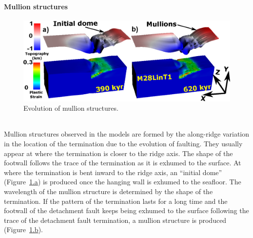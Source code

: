 \paragraph{Mullion structures}

\begin{figure}[h]
  \centering
    \includegraphics[width=1.0\textwidth]{./Figures/fig_Results_3_2_6_mullion_evolution.eps}
  \caption{Evolution of mullion structures.}
 \label{fig_Results_3_2_6_mullion_evolution}
\end{figure}
~\\
Mullion structures observed in the models are formed by the along-ridge variation in the location of the termination due to the evolution of faulting. They usually appear at where the termination is closer to the ridge axis. The shape of the footwall follows the trace of the termination as it is exhumed to the surface. At where the termination is bent inward to the ridge axis, an ``initial dome'' (Figure~\hyperref[fig_Results_3_2_6_mullion_evolution]{\ref{fig_Results_3_2_6_mullion_evolution}.a}) is produced once the hanging wall is exhumed to the seafloor. The wavelength of the mullion structure is determined by the shape of the termination. If the pattern of the termination lasts for a long time and the footwall of the detachment fault keeps being exhumed to the surface following the trace of the detachment fault termination, a mullion structure is produced (Figure~\hyperref[fig_Results_3_2_6_mullion_evolution]{\ref{fig_Results_3_2_6_mullion_evolution}.b}). 



